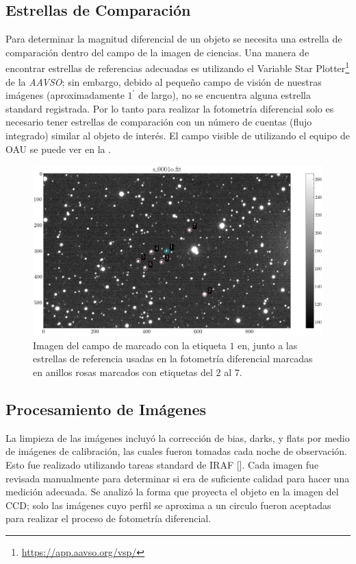 \subsection{Estrellas de Comparación}

Para determinar la magnitud diferencial de un objeto se necesita una estrella de
comparación dentro del campo de la imagen de ciencias. Una manera de
encontrar estrellas de referencias adecuadas es utilizando el Variable Star
Plotter\footnote{\url{https://app.aavso.org/vsp/}} de la \textit{AAVSO}; sin
embargo, debido al pequeño campo de visión de nuestras imágenes
(aproximadamente $1^{\prime}$ de largo), no se encuentra alguna estrella
standard registrada. Por lo tanto para realizar la fotometría diferencial solo
es necesario tener estrellas de comparación con un número de cuentas (flujo
integrado) similar al objeto de interés. El campo visible de \atoObjId
utilizando el equipo de OAU se puede ver en la .

\begin{figure}[!ht]
	\centering
	\includegraphics[scale=0.5]{Observaciones/Secciones/Figures/Figura Campo Observado.png}
	\caption{Imagen del campo de \atoObjId marcado con la etiqueta $1$ en, 
	junto a las estrellas de referencia usadas en la fotometría diferencial 
	marcadas en anillos rosas marcados con etiquetas del $2$ al $7$.}
	\label{figuraCcdCampo}
\end{figure}

\subsection{Procesamiento de Imágenes}

La limpieza de las imágenes incluyó la corrección de bias, darks, y flats por
medio de imágenes de calibración, las cuales fueron tomadas cada noche de
observación. Esto fue realizado utilizando tareas standard de IRAF
[]. Cada imagen fue revisada manualmente para
determinar si era de suficiente calidad para hacer una medición adecuada. Se
analizó la forma que proyecta el objeto en la imagen del CCD; solo las imágenes
cuyo perfil se aproxima a un circulo fueron aceptadas para realizar el proceso
de fotometría diferencial.

